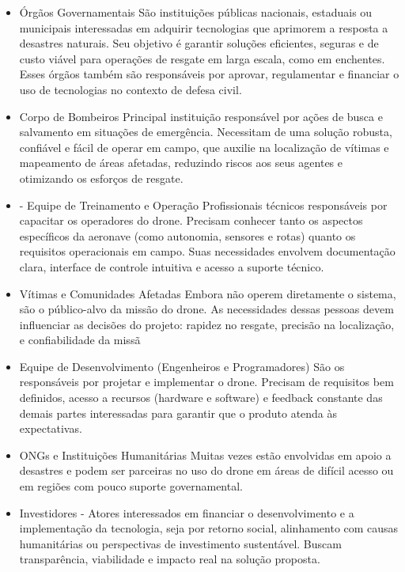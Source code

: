 \documentclass[a4paper,12pt]{report}
\begin{document}
\begin{itemize}
    \item Órgãos Governamentais
São instituições públicas nacionais, estaduais ou municipais interessadas em adquirir tecnologias que aprimorem a resposta a desastres naturais. Seu objetivo é garantir soluções eficientes, seguras e de custo viável para operações de resgate em larga escala, como em enchentes. Esses órgãos também são responsáveis por aprovar, regulamentar e financiar o uso de tecnologias no contexto de defesa civil.
\item  Corpo de Bombeiros
Principal instituição responsável por ações de busca e salvamento em situações de emergência. Necessitam de uma solução robusta, confiável e fácil de operar em campo, que auxilie na localização de vítimas e mapeamento de áreas afetadas, reduzindo riscos aos seus agentes e otimizando os esforços de resgate.

\item  - Equipe de Treinamento e Operação
Profissionais técnicos responsáveis por capacitar os operadores do drone. Precisam conhecer tanto os aspectos específicos da aeronave (como autonomia, sensores e rotas) quanto os requisitos operacionais em campo. Suas necessidades envolvem documentação clara, interface de controle intuitiva e acesso a suporte técnico.

\item   Vítimas e Comunidades Afetadas
Embora não operem diretamente o sistema, são o público-alvo da missão do drone. As necessidades dessas pessoas devem influenciar as decisões do projeto: rapidez no resgate, precisão na localização, e confiabilidade da missã

\item  Equipe de Desenvolvimento (Engenheiros e Programadores)
São os responsáveis por projetar e implementar o drone. Precisam de requisitos bem definidos, acesso a recursos (hardware e software) e feedback constante das demais partes interessadas para garantir que o produto atenda às expectativas.

\item  ONGs e Instituições Humanitárias
Muitas vezes estão envolvidas em apoio a desastres e podem ser parceiras no uso do drone em áreas de difícil acesso ou em regiões com pouco suporte governamental.
\item  Investidores - Atores interessados em financiar o desenvolvimento e a implementação da tecnologia, seja por retorno social, alinhamento com causas humanitárias ou perspectivas de investimento sustentável. Buscam transparência, viabilidade e impacto real na solução proposta.
\end{itemize}
\end{document}
